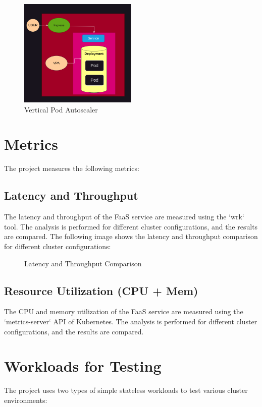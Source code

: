 \documentclass{article}
\begin{document}
\begin{figure}[h]
   \centering
   \includegraphics[width=0.5\textwidth]{../images/vpa.png}
   \caption{Vertical Pod Autoscaler}
\end{figure}

\section{Metrics}
The project measures the following metrics:

\subsection{Latency and Throughput}
The latency and throughput of the FaaS service are measured using the `wrk` tool. The analysis is performed for different cluster configurations, and the results are compared. The following image shows the latency and throughput comparison for different cluster configurations:

\begin{figure}[h]
   \centering
   \caption{Latency and Throughput Comparison}
\end{figure}

\subsection{Resource Utilization (CPU + Mem)}
The CPU and memory utilization of the FaaS service are measured using the `metrics-server` API of Kubernetes. The analysis is performed for different cluster configurations, and the results are compared.

\section{Workloads for Testing}
The project uses two types of simple stateless workloads to test various cluster environments:
\end{document}
